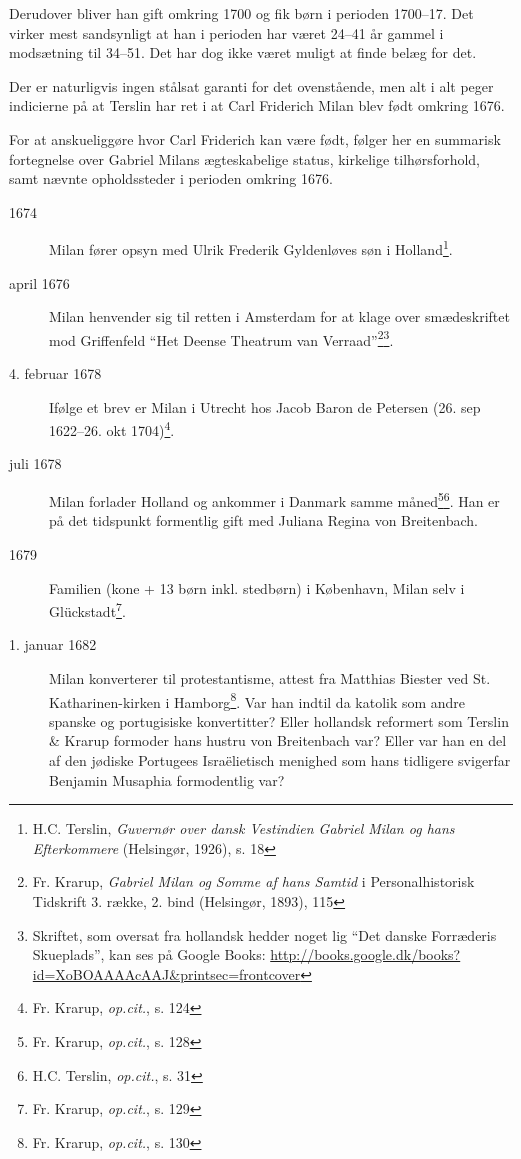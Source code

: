 \documentclass[
	a4paper,
	12pt,
	final
]{memoir}
\begin{document}
Derudover bliver han gift omkring 1700 og fik børn i perioden 1700--17. Det virker mest sandsynligt at han i perioden har været 24--41 år gammel i modsætning til 34--51. Det har dog ikke været muligt at finde belæg for det.

Der er naturligvis ingen stålsat garanti for det ovenstående, men alt i alt peger indicierne på at Terslin har ret i at Carl Friderich Milan blev født omkring 1676.

For at anskueliggøre hvor Carl Friderich kan være født, følger her en summarisk fortegnelse over Gabriel Milans ægteskabelige status, kirkelige tilhørsforhold, samt nævnte opholdssteder i perioden omkring 1676.

\begin{description}

\item[1674] Milan fører opsyn med Ulrik Frederik Gyldenløves søn i Holland\footnote{H.C. Terslin, \emph{Guvernør over dansk Vestindien Gabriel Milan og hans Efterkommere} (Helsingør, 1926), s. 18 }.

\item[april 1676] Milan henvender sig til retten i Amsterdam for at klage over smædeskriftet mod Griffenfeld \enquote{Het Deense Theatrum van Verraad}\footnote{Fr. Krarup, \emph{Gabriel Milan og Somme af hans Samtid} i Personalhistorisk Tidskrift 3. række, 2. bind (Helsingør, 1893), 115}\footnote{Skriftet, som oversat fra hollandsk hedder noget lig \enquote{Det danske Forræderis Skueplads}, kan ses på Google Books: \url{http://books.google.dk/books?id=XoBOAAAAcAAJ&printsec=frontcover}}.

\item[4. februar 1678] Ifølge et brev er Milan i Utrecht hos Jacob Baron de Petersen (26. sep 1622--26. okt 1704)\footnote{Fr. Krarup, \emph{op.cit.}, s. 124}.

\item[juli 1678] Milan forlader Holland og ankommer i Danmark samme måned\footnote{Fr. Krarup, \emph{op.cit.}, s. 128}\footnote{H.C. Terslin, \emph{op.cit.}, s. 31}. Han er på det tidspunkt formentlig gift med Juliana Regina von Breitenbach.

\item[1679] Familien (kone + 13 børn inkl. stedbørn) i København, Milan selv i Glückstadt\footnote{Fr. Krarup, \emph{op.cit.}, s. 129}.

\item[1. januar 1682] Milan konverterer til protestantisme, attest fra Matthias Biester ved St. Katharinen-kirken i Hamborg\footnote{Fr. Krarup, \emph{op.cit.}, s. 130}. Var han indtil da katolik som andre spanske og portugisiske konvertitter? Eller hollandsk reformert som Terslin \& Krarup formoder hans hustru von Breitenbach var? Eller var han en del af den jødiske Portugees Israëlietisch menighed som hans tidligere svigerfar Benjamin Musaphia formodentlig var?

\end{description}
\end{document}

